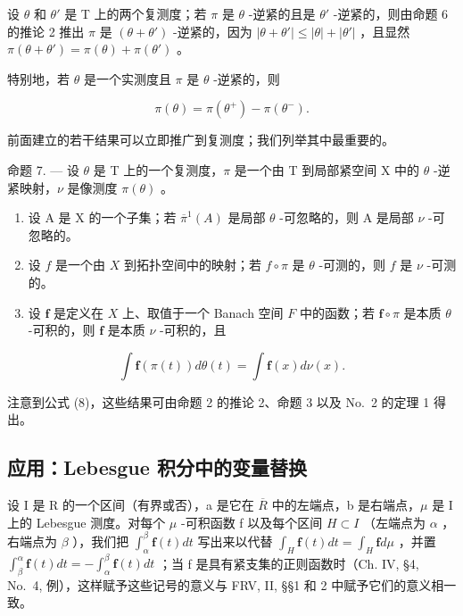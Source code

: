 设 \(\theta\) 和 \(\theta'\) 是 T 上的两个复测度；若 \(\pi\) 是 \(\theta\) -逆紧的且是 \(\theta'\) -逆紧的，则由命题 6 的推论 2 推出 \(\pi\) 是 \((\theta + \theta')\) -逆紧的，因为 \(|\theta + \theta'| \leqslant |\theta| + |\theta'|\) ，且显然 \(\pi(\theta + \theta') = \pi(\theta) + \pi(\theta')\) 。

特别地，若 \(\theta\) 是一个实测度且 \(\pi\) 是 \(\theta\) -逆紧的，则

\[
\pi (\theta) = \pi (\theta^ {+}) - \pi (\theta^ {-}).\tag{9}
\]

前面建立的若干结果可以立即推广到复测度；我们列举其中最重要的。

命题 7. --- 设 \(\theta\) 是 T 上的一个复测度，\(\pi\) 是一个由 T 到局部紧空间 X 中的 \(\theta\) -逆紧映射，\(\nu\) 是像测度 \(\pi(\theta)\) 。

\begin{enumerate}
\def\labelenumi{\alph{enumi})}
\item
  设 A 是 X 的一个子集；若 \(\overline{\pi}^{1}(A)\) 是局部 \(\theta\) -可忽略的，则 A 是局部 \(\nu\) -可忽略的。
\item
  设 \(f\) 是一个由 \(X\) 到拓扑空间中的映射；若 \(f \circ \pi\) 是 \(\theta\) -可测的，则 \(f\) 是 \(\nu\) -可测的。
\item
  设 \(\mathbf{f}\) 是定义在 \(X\) 上、取值于一个 Banach 空间 \(F\) 中的函数；若 \(\mathbf{f} \circ \pi\) 是本质 \(\theta\) -可积的，则 \(\mathbf{f}\) 是本质 \(\nu\) -可积的，且
\end{enumerate}

\[
\int \mathbf {f} (\pi (t)) d \theta (t) = \int \mathbf {f} (x) d \nu (x).\tag{10}
\]

注意到公式 (8)，这些结果可由命题 2 的推论 2、命题 3 以及 No.~2 的定理 1 得出。

\subsection{应用：Lebesgue 积分中的变量替换}

设 I 是 R 的一个区间（有界或否），a 是它在 \(\overline{R}\) 中的左端点，b 是右端点，\(\mu\) 是 I 上的 Lebesgue 测度。对每个 \(\mu\) -可积函数 f 以及每个区间 \(H \subset I\) （左端点为 \(\alpha\) ，右端点为 \(\beta\) ），我们把 \(\int_{\alpha}^{\beta} \mathbf{f}(t) dt\) 写出来以代替 \(\int_{H} \mathbf{f}(t) dt = \int_{H} \mathbf{f} d\mu\) ，并置 \(\int_{\beta}^{\alpha} \mathbf{f}(t) dt = -\int_{\alpha}^{\beta} \mathbf{f}(t) dt\) ；当 f 是具有紧支集的正则函数时（Ch. IV, §4, No.~4, 例），这样赋予这些记号的意义与 FRV, II, §§1 和 2 中赋予它们的意义相一致。

